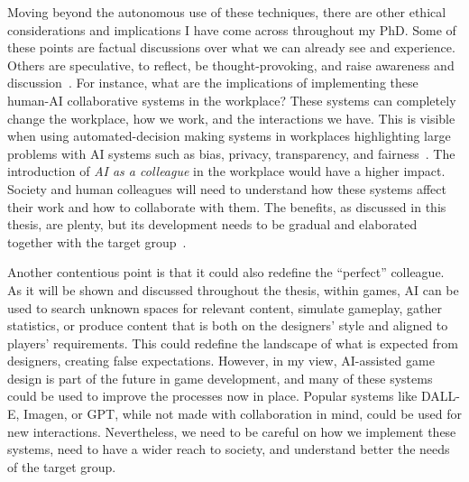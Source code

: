 


Moving beyond the autonomous use of these techniques, there are other ethical considerations and implications I have come across throughout my PhD. Some of these points are factual discussions over what we can already see and experience. Others are speculative, to reflect, be thought-provoking, and raise awareness and discussion~\cite{fiesler_innovating_2021,klassen_run_2022}. For instance, what are the implications of implementing these human-AI collaborative systems in the workplace? These systems can completely change the workplace, how we work, and the interactions we have. This is visible when using automated-decision making systems in workplaces highlighting large problems with AI systems such as bias, privacy, transparency, and fairness~\cite{lepri_ethical_2021}. The introduction of \emph{AI as a colleague} in the workplace would have a higher impact. Society and human colleagues will need to understand how these systems affect their work and how to collaborate with them. The benefits, as discussed in this thesis, are plenty, but its development needs to be gradual and elaborated together with the target group~\cite{lai_towards_2020,partlan_design-driven_2021}.

Another contentious point is that it could also redefine the ``perfect'' colleague. As it will be shown and discussed throughout the thesis, within games, AI can be used to search unknown spaces for relevant content, simulate gameplay, gather statistics, or produce content that is both on the designers' style and aligned to players' requirements. This could redefine the landscape of what is expected from designers, creating false expectations. However, in my view, AI-assisted game design is part of the future in game development, and many of these systems could be used to improve the processes now in place. Popular systems like DALL-E, Imagen, or GPT, while not made with collaboration in mind, could be used for new interactions. Nevertheless, we need to be careful on how we implement these systems, need to have a wider reach to society, and understand better the needs of the target group. 

